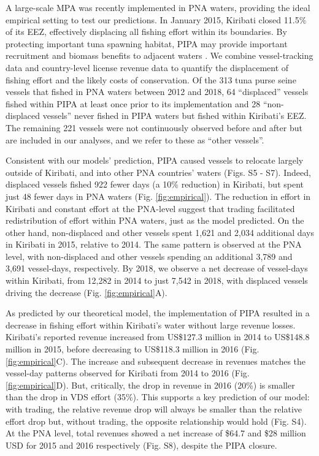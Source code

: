 \documentclass[12pt]{article}
\begin{document}
A large-scale MPA was recently implemented in PNA waters, providing the ideal empirical setting to test our predictions. In January 2015, Kiribati closed 11.5\% of its EEZ, effectively displacing all fishing effort within its boundaries\cite{mccauley_2016,mcdermott_2018}. By protecting important tuna spawning habitat, PIPA may provide important recruitment and biomass benefits to adjacent waters \cite{hernndez_2019}. We combine vessel-tracking data \cite{kroodsma_2018} and country-level license revenue data \cite{ffa_2017} to quantify the displacement of fishing effort and the likely costs of conservation. Of the 313 tuna purse seine vessels that fished in PNA waters between 2012 and 2018, 64 ``displaced'' vessels fished within PIPA at least once prior to its implementation and 28 ``non-displaced vessels'' never fished in PIPA waters but fished within Kiribati's EEZ. The remaining 221 vessels were not continuously observed before and after but are included in our analyses, and we refer to these as ``other vessels''.

Consistent with our models' prediction, PIPA caused vessels to relocate largely outside of Kiribati, and into other PNA countries' waters (Figs. S5 - S7). Indeed, displaced vessels fished 922 fewer days (a 10\% reduction) in Kiribati, but spent just 48 fewer days in PNA waters (Fig. \ref{fig:empirical}).  The reduction in effort in Kiribati and constant effort at the PNA-level suggest that trading facilitated redistribution of effort within PNA waters, just as the model predicted. On the other hand, non-displaced and other vessels spent 1,621 and 2,034 additional days in Kiribati in 2015, relative to 2014. The same pattern is observed at the PNA level, with non-displaced and other vessels spending an additional 3,789 and 3,691 vessel-days, respectively. By 2018, we observe a net decrease of vessel-days within Kiribati, from 12,282 in 2014 to just 7,542 in 2018, with displaced vessels driving the decrease (Fig. \ref{fig:empirical}A).

As predicted by our theoretical model, the implementation of PIPA resulted in a decrease in fishing effort within Kiribati's water without large revenue losses. Kiribati's reported revenue increased from US\$127.3 million in 2014 to US\$148.8 million in 2015, before decreasing to US\$118.3 million in 2016 (Fig. \ref{fig:empirical}C). The increase and subsequent decrease in revenues matches the vessel-day patterns observed for Kiribati from 2014 to 2016 (Fig. \ref{fig:empirical}D). But, critically, the drop in revenue in 2016 (20\%) is smaller than the drop in VDS effort (35\%). This supports a key prediction of our model: with trading, the relative revenue drop will always be smaller than the relative effort drop but, without trading, the opposite relationship would hold (Fig. S4). At the PNA level, total revenues showed a net increase of \$64.7 and \$28 million USD for 2015 and 2016 respectively (Fig. S8), despite the PIPA closure.
\end{document}
